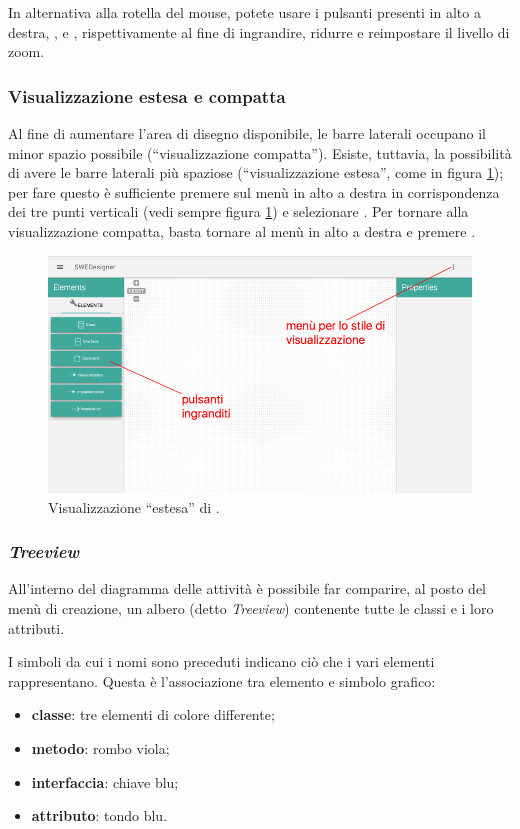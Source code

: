 In alternativa alla rotella del mouse, potete usare i pulsanti presenti in alto a destra, \click{+}, \click{-} e , rispettivamente al fine di ingrandire, ridurre e reimpostare il livello di zoom.

\subsubsection{Visualizzazione estesa e compatta}
Al fine di aumentare l'area di disegno disponibile, le barre laterali occupano il minor spazio possibile (“visualizzazione compatta”). Esiste, tuttavia, la possibilità di avere le barre laterali più spaziose (“visualizzazione estesa”, come in figura \ref{fig:extended}); per fare questo è sufficiente premere sul menù in alto a destra in corrispondenza dei tre punti verticali (vedi sempre figura \ref{fig:extended}) e selezionare . Per tornare alla visualizzazione compatta, basta tornare al menù in alto a destra e premere .

\begin{figure}[h]
\centering
	\includegraphics[scale=0.4]{img/extended}
	\caption{Visualizzazione “estesa” di \proj.}
	\label{fig:extended}
\end{figure}

\subsubsection{\emph{Treeview}}
All'interno del diagramma delle attività è possibile far comparire, al posto del menù di creazione, un albero (detto \emph{Treeview}) contenente tutte le classi e i loro attributi.

I simboli da cui i nomi sono preceduti indicano ciò che i vari elementi rappresentano. Questa è l'associazione tra elemento e simbolo grafico:
\begin{itemize}
	\item \textbf{classe}: tre elementi di colore differente;
	\item \textbf{metodo}: rombo viola;
	\item \textbf{interfaccia}: chiave blu;
	\item \textbf{attributo}: tondo blu.
\end{itemize}


